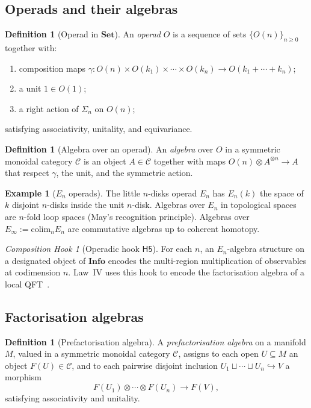 \documentclass[12pt]{article}
\theoremstyle{definition}
\newtheorem{definition}[theorem]{Definition}
\newtheorem{example}[theorem]{Example}
\theoremstyle{remark}
\newtheorem{hook}[theorem]{Composition Hook}
\newcommand{\C}{\mathcal{C}}
\newcommand{\Info}{\mathbf{Info}}
\newcommand{\Set}{\mathbf{Set}}
\begin{document}
\subsection{Operads and their algebras}

\begin{definition}[Operad in $\Set$]
An \emph{operad} $O$ is a sequence of sets $\{O(n)\}_{n \geq 0}$ together with:
\begin{enumerate}
\item composition maps $\gamma : O(n) \times O(k_1) \times \cdots \times O(k_n) \to O(k_1 + \cdots + k_n)$;
\item a unit $1 \in O(1)$;
\item a right action of $\Sigma_n$ on $O(n)$;
\end{enumerate}
satisfying associativity, unitality, and equivariance.
\end{definition}

\begin{definition}[Algebra over an operad]
An \emph{algebra} over $O$ in a symmetric monoidal category $\C$ is an object $A \in \C$ together with maps $O(n) \otimes A^{\otimes n} \to A$ that respect $\gamma$, the unit, and the symmetric action.
\end{definition}

\begin{example}[$E_n$ operads]
\label{ex:En}
The little $n$-disks operad $E_n$ has $E_n(k)$ the space of $k$ disjoint $n$-disks inside the unit $n$-disk. Algebras over $E_n$ in topological spaces are $n$-fold loop spaces (May's recognition principle). Algebras over $E_\infty := \mathrm{colim}_n E_n$ are commutative algebras up to coherent homotopy.
\end{example}

\begin{hook}[Operadic hook $\mathsf{H5}$]
\label{hook:H5}
For each $n$, an $E_n$-algebra structure on a designated object of $\Info$ encodes the multi-region multiplication of observables at codimension $n$. Law~IV uses this hook to encode the factorisation algebra of a local QFT~\cite{costello2017}.
\end{hook}

\subsection{Factorisation algebras}

\begin{definition}[Prefactorisation algebra]
A \emph{prefactorisation algebra} on a manifold $M$, valued in a symmetric monoidal category $\C$, assigns to each open $U \subseteq M$ an object $F(U) \in \C$, and to each pairwise disjoint inclusion $U_1 \sqcup \cdots \sqcup U_n \hookrightarrow V$ a morphism
\[
F(U_1) \otimes \cdots \otimes F(U_n) \to F(V),
\]
satisfying associativity and unitality.
\end{definition}
\end{document}
